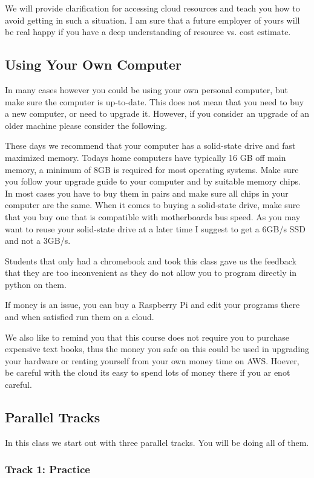 We will provide clarification for accessing cloud resources and teach
you how to avoid getting in such a situation. I am sure that a future
employer of yours will be real happy if you have a deep understanding of
resource vs. cost estimate.

\subsection{Using Your Own Computer}

In many cases however you could be using your own personal computer, but
make sure the computer is up-to-date. This does not mean that you need
to buy a new computer, or need to upgrade it. However, if you consider
an upgrade of an older machine please consider the following.

These days we recommend that your computer has a solid-state drive and
fast maximized memory. Todays home computers have typically 16 GB off
main memory, a minimum of 8GB is required for most operating systems.
Make sure you follow your upgrade guide to your computer and by suitable
memory chips. In most cases you have to buy them in pairs and make sure
all chips in your computer are the same. When it comes to buying a
solid-state drive, make sure that you buy one that is compatible with
motherboards bus speed. As you may want to reuse your solid-state drive
at a later time I suggest to get a 6GB/s SSD and not a 3GB/s.

Students that only had a chromebook and took this class gave us the
feedback that they are too inconvenient as they do not allow you to
program directly in python on them.

If money is an issue, you can buy a Raspberry Pi and edit your programs
there and when satisfied run them on a cloud.

We also like to remind you that this course does not require you to
purchase expensive text books, thus the money you safe on this could be
used in upgrading your hardware or renting yourself from your own money
time on AWS. Hoever, be careful with the cloud its easy to spend lots of
money there if you ar enot careful.

\subsection{Parallel Tracks}

In this class we start out with three parallel tracks. You will be doing
all of them.

\subsubsection{Track 1: Practice}


